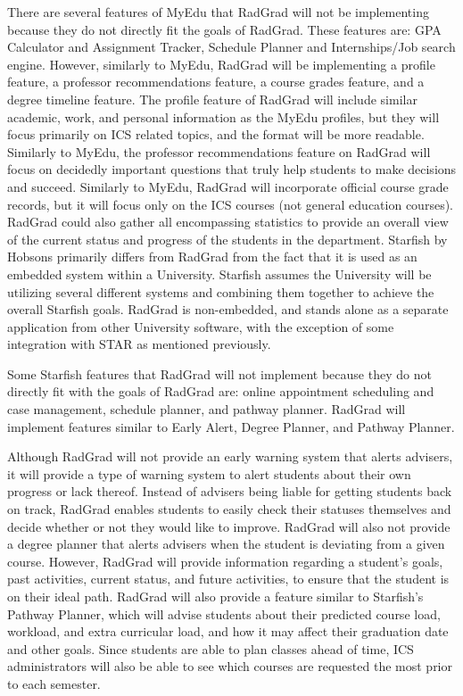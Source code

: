 There are several features of MyEdu that RadGrad will not be implementing because they do not directly fit the goals of RadGrad. These features are: GPA Calculator and Assignment Tracker, Schedule Planner and Internships/Job search engine. However, similarly to MyEdu, RadGrad will be implementing a profile feature, a professor recommendations feature, a course grades feature, and a degree timeline feature. 
The profile feature of RadGrad will include similar academic, work, and personal information as the MyEdu profiles, but they will focus primarily on ICS related topics, and the format will be more readable. Similarly to MyEdu, the professor recommendations feature on RadGrad will focus on decidedly important questions that truly help students to make decisions and succeed. Similarly to MyEdu, RadGrad will incorporate official course grade records, but it will focus only on the ICS courses (not general education courses). RadGrad could also gather all encompassing statistics to provide an overall view of the current status and progress of the students in the department. 
Starfish by Hobsons primarily differs from RadGrad from the fact that it is used as an embedded system within a University. Starfish assumes the University will be utilizing several different systems and combining them together to achieve the overall Starfish goals. RadGrad is non-embedded, and stands alone as a separate application from other University software, with the exception of some integration with STAR as mentioned previously. 

Some Starfish features that RadGrad will not implement because they do not directly fit with the goals of RadGrad are: online appointment scheduling and case management, schedule planner, and pathway planner. RadGrad will implement features similar to Early Alert, Degree Planner, and Pathway Planner. 

Although RadGrad will not provide an early warning system that alerts advisers, it will provide a type of warning system to alert students about their own progress or lack thereof. Instead of advisers being liable for getting students back on track, RadGrad enables students to easily check their statuses themselves and decide whether or not they would like to improve. RadGrad will also not provide a degree planner that alerts advisers when the student is deviating from a given course. However, RadGrad will provide information regarding a student's goals, past activities, current status, and future activities, to ensure that the student is on their ideal path. RadGrad will also provide a feature similar to Starfish's Pathway Planner, which will advise students about their predicted course load, workload, and extra curricular load, and how it may affect their graduation date and other goals. Since students are able to plan classes ahead of time, ICS administrators will also be able to see which courses are requested the most prior to each semester. 

